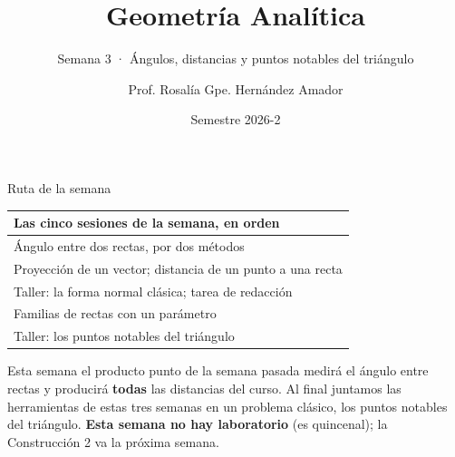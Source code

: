 \documentclass[aspectratio=169,10pt]{beamer}
\title{\LARGE\textbf{Geometría Analítica}}
\subtitle{Semana 3 · Ángulos, distancias y puntos notables del triángulo}
\author{Prof. Rosalía Gpe. Hernández Amador}
\institute{Departamento de Matemáticas · Universidad de Sonora}
\date{Semestre 2026-2}
\newcommand{\destaca}[1]{%
  \par\vspace{3pt}\noindent
  \colorbox{turquesaClaro}{%
    \parbox{\dimexpr\linewidth-2\fboxsep\relax}{\vspace{3pt}#1\vspace{3pt}}}%
  \par\vspace{3pt}}
\begin{document}
\begin{frame}[plain]
  \titlepage
\end{frame}
\begin{frame}{Ruta de la semana}
  \centering
  {\small
  \begin{tabular}{@{}l@{}}
    \toprule
    \textbf{Las cinco sesiones de la semana, en orden} \\
    \midrule
    Ángulo entre dos rectas, por dos métodos \\
    Proyección de un vector; distancia de un punto a una recta \\
    Taller: la forma normal clásica; tarea de redacción \\
    Familias de rectas con un parámetro \\
    Taller: los puntos notables del triángulo \\
    \bottomrule
  \end{tabular}}

  \vspace{0.4cm}
  \raggedright
  \destaca{Esta semana el producto punto de la semana pasada medirá el
  ángulo entre rectas y producirá \textbf{todas} las distancias del
  curso. Al final juntamos las herramientas de estas tres semanas en
  un problema clásico, los puntos notables del triángulo.
  \textbf{Esta semana no hay laboratorio} (es quincenal); la
  Construcción 2 va la próxima semana.}
\end{frame}
\end{document}
